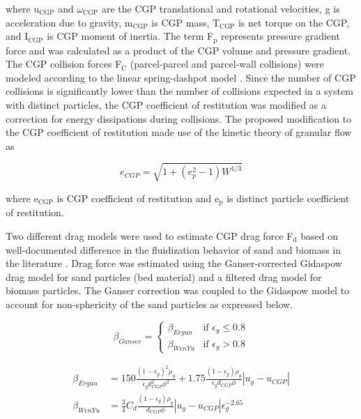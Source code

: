 \noindent where u$_\text{CGP}$ and $\omega_\text{CGP}$ are the CGP translational and rotational velocities, g is acceleration due to gravity, m$_\text{CGP}$ is CGP mass, T$_\text{CGP}$ is net torque on the CGP, and I$_\text{CGP}$ is CGP moment of inertia. The term F$_\text{p}$ represents pressure gradient force and was calculated as a product of the CGP volume and pressure gradient. The CGP collision forces F$_\text{C}$ (parcel-parcel and parcel-wall collisions) were modeled according to the linear spring-dashpot model \cite{Navarro-2013}. Since the number of CGP collisions is significantly lower than the number of collisions expected in a system with distinct particles, the CGP coefficient of restitution was modified as a correction for energy dissipations during collisions. The proposed modification to the CGP coefficient of restitution made use of the kinetic theory of granular flow \cite{Lu-2014} as

\begin{equation}
    e_{CGP} = \sqrt{1 + (e_p^2 - 1) W^{1/3}}
\end{equation}

\noindent where e$_\text{CGP}$ is CGP coefficient of restitution and e$_\text{p}$ is distinct particle coefficient of restitution.

Two different drag models were used to estimate CGP drag force F$_\text{d}$ based on well-documented difference in the fluidization behavior of sand and biomass in the literature \cite{Oliveira-2013}. Drag force was estimated using the Ganser-corrected Gidaspow drag model for sand particles (bed material) and a filtered drag model for biomass particles. The Ganser correction \cite{Ganser-1993} was coupled to the Gidaspow model \cite{Gidaspow-1994} to account for non-sphericity of the sand particles as expressed below.

\begin{equation}
    \beta_{Ganser} =
    \begin{cases}
        \beta_{Ergun} & \text{if } \epsilon_g \leq 0.8 \\
        \beta_{WenYu} & \text{if } \epsilon_g > 0.8
    \end{cases}
\end{equation}

\begin{align}
    \beta_{Ergun} &= 150 \frac{(1 - \epsilon_g)^2 \mu_g}{\epsilon_g d^2_{CGP} \phi^2} + 1.75 \frac{(1 - \epsilon_g) \rho_g}{\epsilon_g d_{CGP} \phi} |u_g - u_{CGP}| \\
    \beta_{WenYu} &= \frac{3}{4} C_d \frac{(1 - \epsilon_g) \rho_g}{d_{CGP} \phi} |u_g - u_{CGP}| \epsilon_g^{-2.65}
\end{align}

